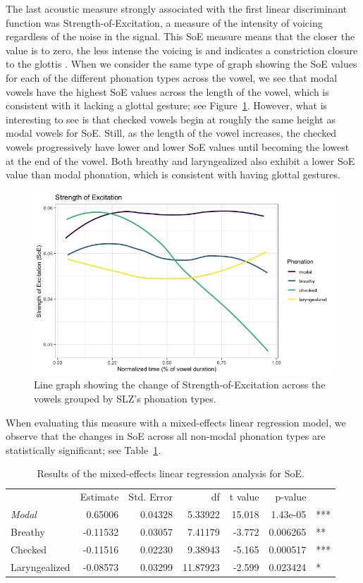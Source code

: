 \documentclass[12pt, letterpaper]{article}
\providecommand{\lsptoprule}{\midrule\toprule}
\providecommand{\lspbottomrule}{\bottomrule\midrule}
\begin{document}
The last acoustic measure strongly associated with the first linear discriminant function was Strength-of-Excitation, a measure of the intensity of voicing regardless of the noise in the signal. This SoE measure means that the closer the value is to zero, the less intense the voicing is and indicates a constriction closure to the glottis \citep{mittalStudyEffectsVocal2014,garellekVoicingGlottalConsonants2021}. When we consider the same type of graph showing the SoE values for each of the different phonation types across the vowel, we see that modal vowels have the highest SoE values across the length of the vowel, which is consistent with it lacking a glottal gesture; see Figure~\ref{fig:SOE}. However, what is interesting to see is that checked vowels begin at roughly the same height as modal vowels for SoE. Still, as the length of the vowel increases, the checked vowels progressively have lower and lower SoE values until becoming the lowest at the end of the vowel. Both breathy and laryngealized also exhibit a lower SoE value than modal phonation, which is consistent with having glottal gestures.

\begin{figure}[!h]
	\centering
	\includegraphics[width=.75\linewidth]{Images/SoE.png}
	\caption{Line graph showing the change of Strength-of-Excitation across the vowels grouped by SLZ's phonation types.}
	\label{fig:SOE}
\end{figure}

When evaluating this measure with a mixed-effects linear regression model, we observe that the changes in SoE across all non-modal phonation types are statistically significant; see Table~\ref{tab:SOE}. 

\begin{table}[!h]
    \centering
    \caption{Results of the mixed-effects linear regression analysis for SoE.}
    \label{tab:SOE}
    \begin{tabular}{lrrrrrl}
	\lsptoprule
					&  Estimate  & Std. Error & df & t value & p-value & \\
        \textit{Modal}  &   0.65006  &  0.04328 &  5.33922 & 15.018 & 1.43e-05 & *** \\  
  	Breathy   		&  -0.11532  &  0.03057 &  7.41179 & -3.772 & 0.006265 & ** \\
	Checked    		&  -0.11516  &  0.02230 &  9.38943 & -5.165 & 0.000517 & *** \\
	Laryngealized	&  -0.08573  &  0.03299 & 11.87923 & -2.599 & 0.023424 & * \\
    \lspbottomrule
    \end{tabular}
\end{table}
\end{document}
